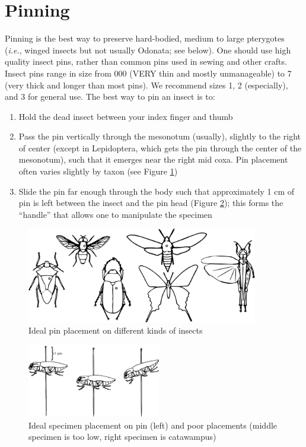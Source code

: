 \section{Pinning}\label{pinning}
Pinning is the best way to preserve hard-bodied, medium to large pterygotes (\textit{i.e.}, winged insects but not usually Odonata; see below). One should use high quality insect pins, rather than common pins used in sewing and other crafts. Insect pins range in size from 000 (VERY thin and mostly unmanageable) to 7 (very thick and longer than most pins). We recommend sizes 1, 2 (especially), and 3 for general use. The best way to pin an insect is to:
 
\begin{enumerate}
\item Hold the dead insect between your index finger and thumb
\item Pass the pin vertically through the mesonotum (usually), slightly to the right of center (except in Lepidoptera, which gets the pin through the center of the mesonotum), such that it emerges near the right mid coxa.  Pin placement often varies slightly by taxon (see Figure \ref{pinthorax})
\item Slide the pin far enough through the body such that approximately 1 cm of pin is left between the insect and the pin head (Figure \ref{pinplace}); this forms the ``handle'' that allows one to manipulate the specimen
\end{enumerate}

\begin{figure}[ht!]
	\centering
  \includegraphics[width=0.9\textwidth]{sections/img/specimenPreps/PinsThorax}
  \caption{Ideal pin placement on different kinds of insects}
  \label{pinthorax}
\end{figure}

\begin{figure}[ht!]
	\centering
  \includegraphics[width=0.52\textwidth]{sections/img/specimenPreps/PinPlacement}
  \caption{Ideal specimen placement on pin (left) and poor placements (middle specimen is too low, right specimen is catawampus) \citep[modified from][Fig. 16]{USDAmanual1986}}
  \label{pinplace}
\end{figure}

